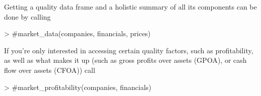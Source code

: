 \documentclass[12pt]{article}
\begin{document}
Getting a quality data frame and a holistic summary of all its components can be done by calling

\begin{Schunk}
\begin{Sinput}
> #market_data(companies, financials, prices)
\end{Sinput}
\end{Schunk}

If you're only interested in accessing certain quality factors, such as profitability, as well as what makes it up (such as gross profits over assets (GPOA), or cash flow over assets (CFOA)) call

\begin{Schunk}
\begin{Sinput}
> #market_profitability(companies, financials)
\end{Sinput}
\end{Schunk}
\end{document}
